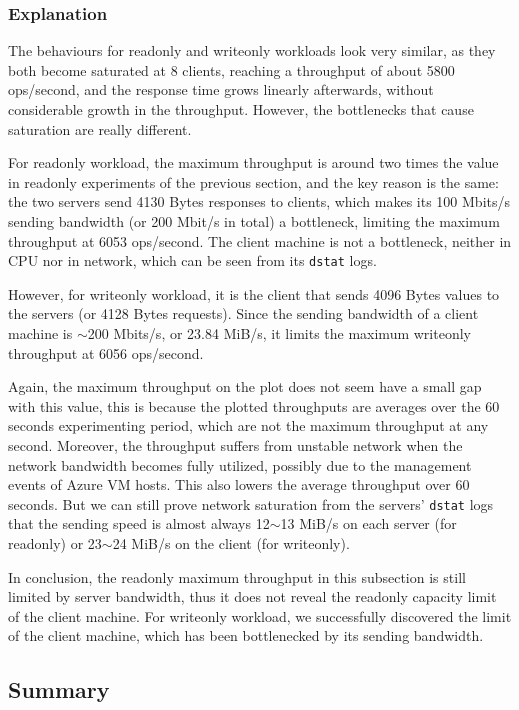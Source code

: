 \subsubsection{Explanation}

The behaviours for readonly and writeonly workloads look very similar, as they both become saturated at 8 clients, reaching a throughput of about 5800 ops/second, and the response time grows linearly afterwards, without considerable growth in the throughput. However, the bottlenecks that cause saturation are really different.

For readonly workload, the maximum throughput is around two times the value in readonly experiments of the previous section, and the key reason is the same: the two servers send 4130 Bytes responses to clients, which makes its 100 Mbits/s sending bandwidth (or 200 Mbit/s in total) a bottleneck, limiting the maximum throughput at 6053 ops/second. The client machine is not a bottleneck, neither in CPU nor in network, which can be seen from its \texttt{dstat} logs.

However, for writeonly workload, it is the client that sends 4096 Bytes values to the servers (or 4128 Bytes requests). Since the sending bandwidth of a client machine is $\sim$200 Mbits/s, or 23.84 MiB/s, it limits the maximum writeonly throughput at 6056 ops/second. 

Again, the maximum throughput on the plot does not seem have a small gap with this value, this is because the plotted throughputs are averages over the 60 seconds experimenting period, which are not the maximum throughput at any second. Moreover, the throughput suffers from unstable network when the network bandwidth becomes fully utilized, possibly due to the management events of Azure VM hosts. This also lowers the average throughput over 60 seconds. But we can still prove network saturation from the servers' \texttt{dstat} logs that the sending speed is almost always 12$\sim$13 MiB/s on each server (for readonly) or 23$\sim$24 MiB/s on the client (for writeonly).

In conclusion, the readonly maximum throughput in this subsection is still limited by server bandwidth, thus it does not reveal the readonly capacity limit of the client machine. For writeonly workload, we successfully discovered the limit of the client machine, which has been bottlenecked by its sending bandwidth.

\subsection{Summary}

